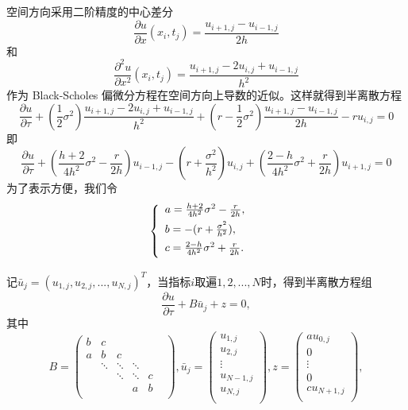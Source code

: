 \documentclass{article}
\begin{document}
空间方向采用二阶精度的中心差分
$$\frac{\partial u}{\partial x}(x_i, t_j) = \frac{u_{i+1, j} - u_{i-1, j}}{2h}$$
和
$$\frac{\partial^2 u}{\partial x^2}(x_i, t_j) = \frac{u_{i+1, j} - 2u_{i, j} + u_{i-1, j}}{h^2}$$
作为 Black-Scholes 偏微分方程在空间方向上导数的近似。这样就得到半离散方程
$$\frac{\partial u}{\partial \tau} + (\frac{1}{2}\sigma^2)\frac{u_{i+1, j} - 2u_{i, j} + u_{i-1, j}}{h^2} + (r - \frac{1}{2}\sigma^2)\frac{u_{i+1, j} - u_{i-1, j}}{2h} - ru_{i, j} = 0$$
即$$\frac{\partial u}{\partial \tau} + (\frac{h+2}{4h^2}\sigma^2 - \frac{r}{2h})u_{i-1, j} - (r + \frac{\sigma^2}{h^2})u_{i, j} + (\frac{2-h}{4h^2}\sigma^2 + \frac{r}{2h})u_{i+1, j} = 0$$
为了表示方便，我们令
\begin{equation}
\left\{
        \begin{array}{lr}
        \vspace{1ex}
        a = \frac{h+2}{4h^2}\sigma^2 - \frac{r}{2h}, & \\
        \vspace{1ex}
        b = -(r + \frac{\sigma^2}{h^2}), & \\
        \vspace{1ex}
        c = \frac{2-h}{4h^2}\sigma^2 + \frac{r}{2h}. &  
        \end{array}
\right.
\nonumber
\end{equation}

记$\bar{u}_j = (u_{1, j}, u_{2, j},...,u_{N, j})^T$，当指标$i$取遍$1,2,...,N$时，得到半离散方程组
$$\frac{\partial u}{\partial \tau} + B\bar{u}_j + z = 0, $$
其中$$
B = \begin{pmatrix}
        b &   c    &        &        &   & \\
        a &   b    &   c    &        &   & \\
          & \ddots & \ddots & \ddots &   & \\
          &        & \ddots & \ddots & c & \\
          &        &        &   a    & b & \\
    \end{pmatrix},
\bar{u}_j = \begin{pmatrix}
        u_{1, j}   \\
        u_{2, j}   \\
        \vdots     \\
        u_{N-1, j} \\
        u_{N, j}   \\
    \end{pmatrix},
z = \begin{pmatrix}
        au_{0, j}   \\
        0           \\
        \vdots      \\
        0           \\
        cu_{N+1, j} \\
    \end{pmatrix},
$$
\end{document}
